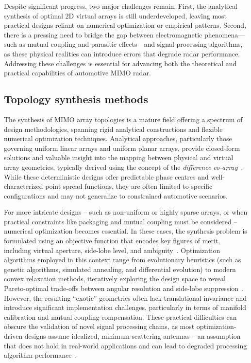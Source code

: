 Despite significant progress, two major challenges remain.
First, the analytical synthesis of optimal 2D virtual arrays is still underdeveloped, leaving most practical designs reliant on numerical optimization or empirical patterns.
Second, there is a pressing need to bridge the gap between electromagnetic phenomena—such as mutual coupling and parasitic effects—and signal processing algorithms, as these physical realities can introduce errors that degrade radar performance.
Addressing these challenges is essential for advancing both the theoretical and practical capabilities of automotive MIMO radar.

\subsection{Topology synthesis methods}

The synthesis of MIMO array topologies is a mature field offering a spectrum of design methodologies, spanning rigid analytical constructions and flexible numerical optimization techniques.
Analytical approaches, particularly those governing uniform linear arrays and uniform planar arrays, provide closed-form solutions and valuable insight into the mapping between physical and virtual array geometries, typically derived using the concept of the \emph{difference co-array}~\parencite{aminSparseArraysRadar2024}.
While these deterministic designs offer predictable phase centres and well-characterized point spread functions, they are often limited to specific configurations and may not generalize to constrained automotive scenarios.

For more intricate designs -- such as non-uniform or highly sparse arrays, or when practical constraints like packaging and mutual coupling must be considered -- numerical optimization becomes essential.
In these cases, the synthesis problem is formulated using an objective function that encodes key figures of merit, including virtual aperture, side-lobe level, and ambiguity~\parencite{ericAmbiguityCharacterizationArbitrary1998}.
Optimization algorithms employed in this context range from evolutionary heuristics (such as genetic algorithms, simulated annealing, and differential evolution) to modern convex relaxation methods, iteratively exploring the design space to reveal Pareto-optimal trade-offs between angular resolution and side-lobe suppression~\parencite{huanSASASuperResolutionAmbiguityFree2023}.
However, the resulting \enquote{exotic} geometries often lack translational invariance and introduce significant implementation challenges, particularly in terms of manifold calibration and mutual coupling compensation.
These practical difficulties can obscure the validation of novel signal processing chains, as most optimization-driven designs assume idealized, minimum-scattering antennas -- an assumption that does not hold in real-world applications and can lead to degraded processing algorithm performance~\parencite{arnoldEffectAntennaMutual2019}.

